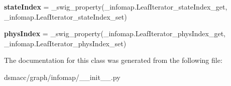 \begin{DoxyCompactItemize}
\mbox{\label{classdsmacc_1_1graph_1_1infomap_1_1LeafIterator_a58f1361b88fac685e27a6073145a0a94}} 
{\bfseries state\+Index} = \+\_\+swig\+\_\+property(\+\_\+infomap.\+Leaf\+Iterator\+\_\+state\+Index\+\_\+get, \+\_\+infomap.\+Leaf\+Iterator\+\_\+state\+Index\+\_\+set)
\item 
\mbox{\label{classdsmacc_1_1graph_1_1infomap_1_1LeafIterator_ac57957c8c505df25454f86d98d7a43bb}} 
{\bfseries phys\+Index} = \+\_\+swig\+\_\+property(\+\_\+infomap.\+Leaf\+Iterator\+\_\+phys\+Index\+\_\+get, \+\_\+infomap.\+Leaf\+Iterator\+\_\+phys\+Index\+\_\+set)
\end{DoxyCompactItemize}


The documentation for this class was generated from the following file\+:\begin{DoxyCompactItemize}
\item 
dsmacc/graph/infomap/\+\_\+\+\_\+init\+\_\+\+\_\+.\+py\end{DoxyCompactItemize}
